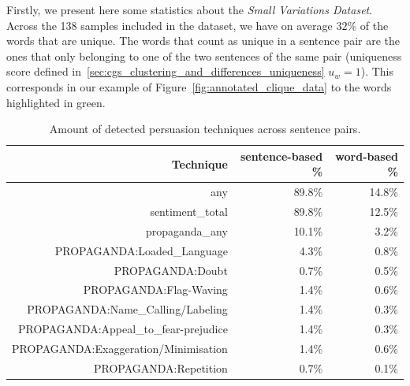 Firstly, we present here some statistics about the \emph{Small Variations Dataset}.
Across the 138 samples included in the dataset, we have on average $32\%$ of the words that are unique. The words that count as unique in a sentence pair are the ones that only belonging to one of the two sentences of the same pair (uniqueness score defined in~\ref{sec:cgs_clustering_and_differences_uniqueness} $u_w = 1$). This corresponds in our example of Figure~\ref{fig:annotated_clique_data} to the words highlighted in green.

\begin{table}[!htbp]
    \centering
    \begin{tabular}{r|rr}
         Technique & sentence-based \% & word-based \% \\
         \hline
         any & 89.8\% & 14.8\% \\
        sentiment\_total & 89.8\% & 12.5\% \\
        propaganda\_any & 10.1\% & 3.2\% \\
        PROPAGANDA:Loaded\_Language & 4.3\% & 0.8\% \\
        PROPAGANDA:Doubt & 0.7\% & 0.5\% \\
        PROPAGANDA:Flag-Waving & 1.4\% & 0.6\% \\
        PROPAGANDA:Name\_Calling/Labeling & 1.4\% & 0.3\% \\
        PROPAGANDA:Appeal\_to\_fear-prejudice & 1.4\% & 0.3\% \\
        PROPAGANDA:Exaggeration/Minimisation & 1.4\% & 0.6\% \\
        PROPAGANDA:Repetition & 0.7\% & 0.1\% \\
    \end{tabular}
    \caption{Amount of detected persuasion techniques across sentence pairs.}
    \label{tab:detected_persuasion_in_variations}
\end{table}

